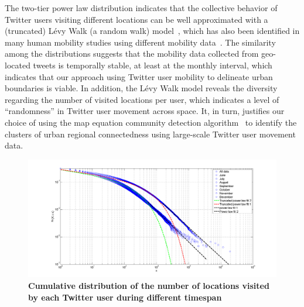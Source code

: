 \documentclass[10pt,letterpaper]{article}
\begin{document}
The two-tier power law distribution indicates that the collective behavior of Twitter users visiting different locations can be well approximated with a (truncated) L\'{e}vy Walk (a random walk) model~\cite{rhee2011,reynolds2012}, which has also been identified in many human mobility studies using different mobility data~\cite{zhao2015}.
The similarity among the distributions suggests that the mobility data collected from geo-located tweets is temporally stable, at least at the monthly interval, which indicates that our approach using Twitter user mobility to delineate urban boundaries is viable.  
In addition, the L\'{e}vy Walk model reveals the diversity regarding the number of visited locations per user, which indicates a level of ``randomness'' in Twitter user movement across space. 
It, in turn, justifies our choice of using the map equation community detection algorithm~\cite{rosvall2008} to identify the clusters of urban regional connectedness using large-scale Twitter user movement data.

\begin{figure}[ht]
\includegraphics[width=1.0\linewidth]{./figure/PNG/S3_visitation}
\caption{{\bf Cumulative distribution of the number of locations visited by each Twitter user during different timespan}}
\label{S3_Fig}
\end{figure}
\end{document}
